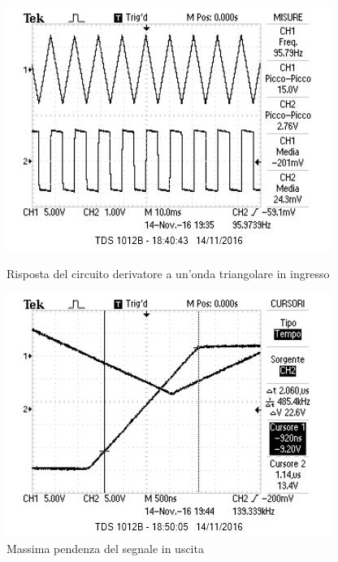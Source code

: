 \documentclass[10pt,a4paper]{article}
\begin{document}
\begin{figure}[h!]
\centering
	\begin{minipage}[c]{0.45\textwidth}
		\centering
		\includegraphics[width=\textwidth]{../oscilloscopio/trdev.jpg}
		\caption{Risposta del circuito derivatore a un'onda triangolare in ingresso}
		\label{fig:trdev}
	\end{minipage}
	\begin{minipage}[c]{0.45\textwidth}
		\centering
		\includegraphics[width=\textwidth]{../oscilloscopio/slewperf.jpg}
		\caption{Massima pendenza del segnale in uscita}
		\label{fig:slewperf}
	\end{minipage}
\end{figure}
\end{document}
